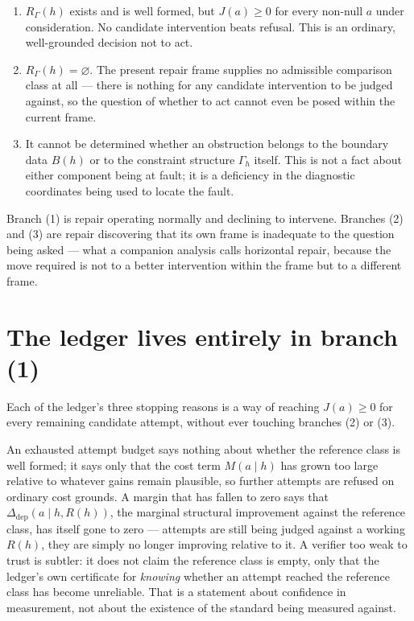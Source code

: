 \documentclass[11pt,openany]{book}
\begin{document}
\begin{enumerate}
\item[(1)] $R_\Gamma(h)$ exists and is well formed, but $J(a) \geq 0$ for every non-null $a$ under consideration. No candidate intervention beats refusal. This is an ordinary, well-grounded decision not to act.
\item[(2)] $R_\Gamma(h) = \varnothing$. The present repair frame supplies no admissible comparison class at all — there is nothing for any candidate intervention to be judged against, so the question of whether to act cannot even be posed within the current frame.
\item[(3)] It cannot be determined whether an obstruction belongs to the boundary data $B(h)$ or to the constraint structure $\Gamma_h$ itself. This is not a fact about either component being at fault; it is a deficiency in the diagnostic coordinates being used to locate the fault.
\end{enumerate}

Branch (1) is repair operating normally and declining to intervene. Branches (2) and (3) are repair discovering that its own frame is inadequate to the question being asked — what a companion analysis calls horizontal repair, because the move required is not to a better intervention within the frame but to a different frame.

\section{The ledger lives entirely in branch (1)}

Each of the ledger's three stopping reasons is a way of reaching $J(a) \geq 0$ for every remaining candidate attempt, without ever touching branches (2) or (3).

An exhausted attempt budget says nothing about whether the reference class is well formed; it says only that the cost term $M(a\mid h)$ has grown too large relative to whatever gains remain plausible, so further attempts are refused on ordinary cost grounds. A margin that has fallen to zero says that $\Delta_{\mathrm{dep}}(a\mid h, R(h))$, the marginal structural improvement against the reference class, has itself gone to zero — attempts are still being judged against a working $R(h)$, they are simply no longer improving relative to it. A verifier too weak to trust is subtler: it does not claim the reference class is empty, only that the ledger's own certificate for \emph{knowing} whether an attempt reached the reference class has become unreliable. That is a statement about confidence in measurement, not about the existence of the standard being measured against.
\end{document}
